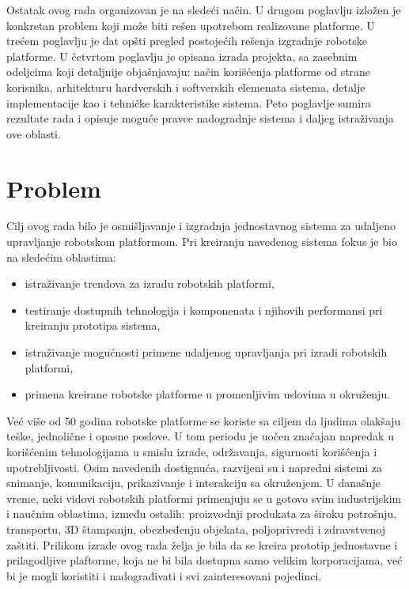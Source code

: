 \documentclass[12pt,a4paper]{report}
\begin{document}
Ostatak ovog rada organizovan je na sledeći način. U drugom poglavlju izložen je konkretan problem koji može biti rešen upotrebom realizovane platforme. U trećem poglavlju je dat opšti pregled postojećih rešenja izgradnje robotske platforme. U četvrtom poglavlju je opisana izrada projekta, sa zasebnim odeljcima koji detaljnije objašnjavaju: način korišćenja platforme od strane korisnika, arhitekturu hardverskih i softverskih elemenata sistema, detalje implementacije kao i tehničke karakteristike sistema. Peto poglavlje sumira rezultate rada i opisuje moguće pravce nadogradnje sistema i daljeg istraživanja ove oblasti. 

\newpage

\chapter{Problem}
Cilj ovog rada bilo je osmišljavanje i izgradnja jednostavnog sistema za udaljeno upravljanje robotskom platformom. Pri kreiranju navedenog sistema fokus je bio na sledećim oblastima:

\begin{itemize}
\item istraživanje trendova za izradu robotskih platformi,
\item testiranje dostupnih tehnologija i komponenata i njihovih performansi pri kreiranju prototipa sistema,
\item istraživanje mogućnosti primene udaljenog upravljanja pri izradi robotskih platformi,
\item primena kreirane robotske platforme u promenljivim uslovima u okruženju.
\end{itemize}
Već više od 50 godina robotske platforme se koriste sa ciljem da ljudima olakšaju teške, jednolične i opasne poslove. U tom periodu je uočen značajan napredak u korišćenim tehnologijama u smislu izrade, održavanja, sigurnosti korišćenja i upotrebljivosti. Osim navedenih dostignuća, razvijeni su i napredni sistemi za snimanje, komunikaciju, prikazivanje i interakciju sa okruženjem. U današnje vreme, neki vidovi robotskih platformi primenjuju se u gotovo svim industrijskim i naučnim oblastima, između ostalih: proizvodnji produkata za široku potrošnju, transportu, 3D štampanju, obezbeđenju objekata, poljoprivredi i zdravstvenoj zaštiti. Prilikom izrade ovog rada želja je bila da se kreira prototip jednostavne i prilagodljive plaftorme, koja ne bi bila dostupna samo velikim korporacijama, već bi je mogli koristiti i nadograđivati i svi zainteresovani pojedinci.
\end{document}
